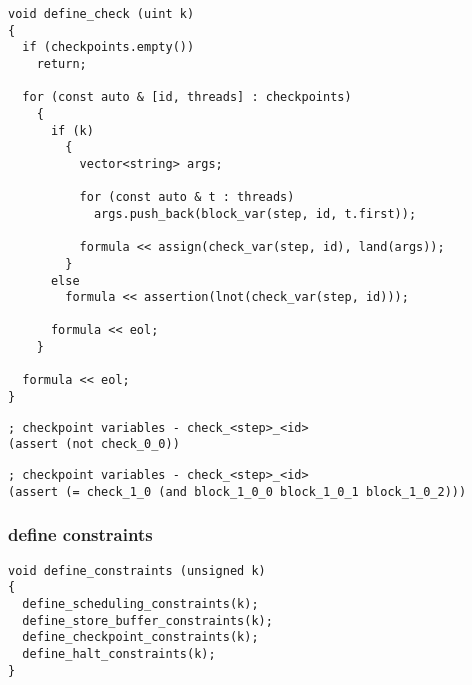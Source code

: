 \begin{lstlisting}[style=c++]
void define_check (uint k)
{
  if (checkpoints.empty())
    return;

  for (const auto & [id, threads] : checkpoints)
    {
      if (k)
        {
          vector<string> args;

          for (const auto & t : threads)
            args.push_back(block_var(step, id, t.first));

          formula << assign(check_var(step, id), land(args));
        }
      else
        formula << assertion(lnot(check_var(step, id)));

      formula << eol;
    }

  formula << eol;
}
\end{lstlisting}

\begin{lstlisting}[language=SMTLib]
; checkpoint variables - check_<step>_<id>
(assert (not check_0_0))
\end{lstlisting}

\begin{lstlisting}[language=SMTLib]
; checkpoint variables - check_<step>_<id>
(assert (= check_1_0 (and block_1_0_0 block_1_0_1 block_1_0_2)))
\end{lstlisting}

\subsubsection{define constraints}


\begin{algorithm}[H]
\end{algorithm}

\begin{lstlisting}[style=c++]
void define_constraints (unsigned k)
{
  define_scheduling_constraints(k);
  define_store_buffer_constraints(k);
  define_checkpoint_constraints(k);
  define_halt_constraints(k);
}
\end{lstlisting}

